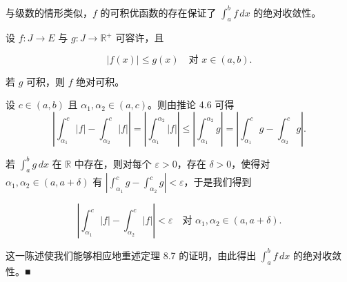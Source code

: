 与级数的情形类似，$ f $ 的可积优函数的存在保证了 $ \int_{a}^{b} f\,dx $ 的绝对收敛性。

\begin{theorem}

设 $ f : J \to E $ 与 $ g : J \to \mathbb{R}^{+} $ 可容许，且

\[
\left| f(x) \right| \le g(x) \quad \text{对 } x \in (a, b) .
\]

若 $ g $ 可积，则 $ f $ 绝对可积。

\proofhead
设 $ c \in (a, b) $ 且 $ \alpha_{1}, \alpha_{2} \in (a, c) $。则由推论 4.6 可得
\[
\left| \int_{\alpha_{1}}^{c} \left| f \right| - \int_{\alpha_{2}}^{c} \left| f \right| \right| = \left| \int_{\alpha_{1}}^{\alpha_{2}} \left| f \right| \right| \le \left| \int_{\alpha_{1}}^{\alpha_{2}} g \right| = \left| \int_{\alpha_{1}}^{c} g - \int_{\alpha_{2}}^{c} g \right| .
\]

若 $ \int_{a}^{b} g\,dx $ 在 $ \mathbb{R} $ 中存在，则对每个 $ \varepsilon > 0 $，存在 $ \delta > 0 $，使得对 $ \alpha_{1}, \alpha_{2} \in (a, a + \delta) $ 有 $ \left| \int_{\alpha_{1}}^{c} g - \int_{\alpha_{2}}^{c} g \right| < \varepsilon $，于是我们得到

\[
\left| \int_{\alpha_{1}}^{c} \left| f \right| - \int_{\alpha_{2}}^{c} \left| f \right| \right| < \varepsilon \quad \text{对 } \alpha_{1}, \alpha_{2} \in (a, a + \delta) .
\]

这一陈述使我们能够相应地重述定理 8.7 的证明，由此得出 $ \int_{a}^{b} f\,dx $ 的绝对收敛性。\nobreak\hspace{0.35em}■

\end{theorem}

